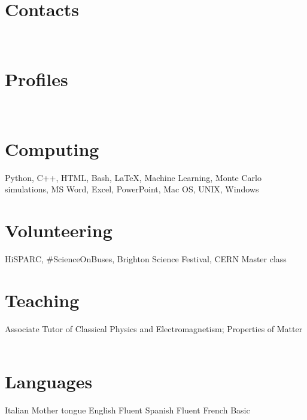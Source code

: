 \documentclass[print]{cv} %
\newcommand{\profilepic}[1]{\renewcommand{\profilepic}{#1}}
\newlength\imagewidth
\newlength\imagescale
\begin{document}


\begin{aside} %
  \section{Contacts}
    \cvmail
    \cvnumberphone
    \cvaddress
  ~
  \section{Profiles}
    \cvlinkedin
    \cvsussex
    \cvgit
    \cvsite
  ~
  \section{Computing} 
      Python, C++, HTML, Bash, \LaTeX,
      Machine Learning, 
      Monte Carlo simulations, 
      MS Word, Excel, PowerPoint,
      Mac OS, UNIX, Windows
  ~
  \section{Volunteering}
    HiSPARC, 
    \#ScienceOnBuses,
    Brighton Science Festival,
    CERN Master class
  ~
  \section{Teaching}
    Associate Tutor of Classical Physics and Electromagnetism; Properties of Matter
  ~
  \section{Languages}
    Italian Mother tongue
    English Fluent
    Spanish Fluent
    French Basic
  ~
\end{aside}
\end{document}
